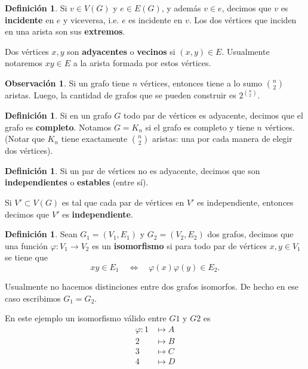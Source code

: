 \documentclass[12pt]{report}
\theoremstyle{plain}
\theoremstyle{definition}
\newtheorem{definition}[theorem]{Definición}
\newtheorem{obs}[theorem]{Observación}
\begin{document}
\begin{definition}
Si $v \in V(G)$ y $e \in E(G)$, y además $v \in e$, decimos que $v$ es \textbf{incidente} en $e$ y viceversa, i.e. $e$ es incidente en $v$. Los dos vértices que inciden en una arista son sus \textbf{extremos}.

Dos vértices $x,y$ son \textbf{adyacentes} o \textbf{vecinos} si $(x,y) \in E$. Usualmente notaremos $xy \in E$ a la arista formada por estos vértices.
\end{definition}

\begin{obs}
Si un grafo tiene $n$ vértices, entonces tiene a lo sumo $\binom n 2$ aristas. Luego, la cantidad de grafos que se pueden construir es $2^{\binom n 2}$.
\end{obs}

\begin{definition}
Si en un grafo $G$ todo par de vértices es adyacente, decimos que el grafo es \textbf{completo}. Notamos $ G =K_n$ si el grafo es completo y tiene $n$ vértices. (Notar que $K_n$ tiene exactamente $\binom n 2$ aristas: una por cada manera de elegir dos vértices).
\end{definition}


\begin{definition}
Si un par de vértices no es adyacente, decimos que son \textbf{independientes} o \textbf{estables} (entre sí).

Si $V' \subset V(G)$ es tal que cada par de vértices en $V'$ es independiente, entonces decimos que $V'$ es \textbf{independiente}.
\end{definition}

\begin{definition}
Sean $G_1 = (V_1,E_1)$ y $G_2 = (V_2, E_2)$ dos grafos, decimos que una función $\varphi : V_1 \rightarrow V_2$ es un \textbf{isomorfismo} si para todo par de vértices $x,y \in V_1$ se tiene que
\[
    xy \in E_1 \quad \Longleftrightarrow \quad \varphi (x) \varphi (y) \in E_2.
\]

Usualmente no hacemos distinciones entre dos grafos isomorfos. De hecho en ese caso escribimos $G_1 = G_2$.
\end{definition}


En este ejemplo un isomorfismo válido entre $G1$ y $G2$ es
\begin{align*}
\varphi : 1 &\mapsto A \\
        2 &\mapsto B \\
        3 &\mapsto C \\
        4 &\mapsto D
\end{align*}
\end{document}
